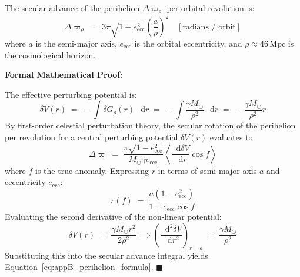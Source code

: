 \documentclass[
    12pt,
    a4paper,
    headings=normal,
    twoside=false,
    open=any,
    parskip=half
]{scrbook}
\newcommand{\diff}{\mathop{}\!\mathrm{d}}
\newenvironment{myproof}[1][]{%
  \par\vspace{6pt}\noindent\textbf{\sffamily\color{maincolor}Formal Mathematical Proof\ifstrempty{#1}{}{ (#1)}}:\par\nopagebreak
}{%
  \penalty50\hfill\ensuremath{\blacksquare}\par\vspace{6pt}
}
\begin{document}
\begin{phystheorem}\label{thm:appB_secular_precession_formula}
The secular advance of the perihelion $\Delta\varpi_\rho$ per orbital revolution is:
\begin{equation}
\boxed{\Delta\varpi_{\rho} \;=\; 3\pi \sqrt{1 - e_{\text{ecc}}^2} \left( \frac{a}{\rho} \right)^2 \quad [\text{radians / orbit}]}
\label{eq:appB_perihelion_formula}
\end{equation}
where $a$ is the semi-major axis, $e_{\text{ecc}}$ is the orbital eccentricity, and $\rho \approx 46\,\text{Mpc}$ is the cosmological horizon.
\end{phystheorem}

\begin{myproof}
The effective perturbing potential is:
\begin{equation*}
\delta V(r) \;=\; -\int \delta G_\rho(r) \, \diff r \;=\; -\int \frac{\gamma M_\odot}{\rho^2} \, \diff r \;=\; -\frac{\gamma M_\odot}{\rho^2} r
\end{equation*}
By first-order celestial perturbation theory, the secular rotation of the perihelion per revolution for a central perturbing potential $\delta V(r)$ evaluates to:
\begin{equation*}
\Delta\varpi \;=\; \frac{\pi \sqrt{1 - e_{\text{ecc}}^2}}{M_\odot \gamma e_{\text{ecc}}} \left\langle \frac{\diff \delta V}{\diff r} \cos f \right\rangle
\end{equation*}
where $f$ is the true anomaly. Expressing $r$ in terms of semi-major axis $a$ and eccentricity $e_{\text{ecc}}$:
\begin{equation*}
r(f) \;=\; \frac{a(1 - e_{\text{ecc}}^2)}{1 + e_{\text{ecc}}\cos f}
\end{equation*}
Evaluating the second derivative of the non-linear potential:
\begin{equation*}
\delta V(r) \;=\; \frac{\gamma M_\odot r^2}{2\rho^2} \implies \left( \frac{\diff^2 \delta V}{\diff r^2} \right)_{r=a} \;=\; \frac{\gamma M_\odot}{\rho^2}
\end{equation*}
Substituting this into the secular advance integral yields Equation~\eqref{eq:appB_perihelion_formula}.
\end{myproof}
\end{document}
